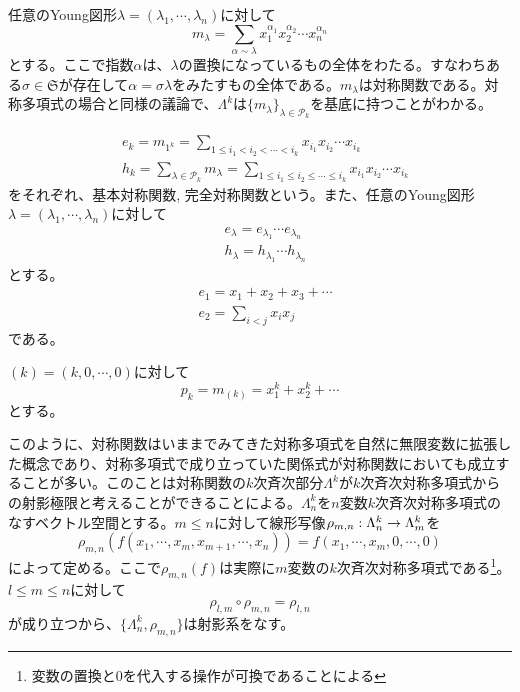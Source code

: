 \documentclass{ltjsreport}
\begin{document}
\begin{eg}[単項対称関数]\label{monomial_sym_func}
  任意のYoung図形$\lambda=(\lambda_1,\cdots,\lambda_n)$に対して
  \[
  m_{\lambda}=\sum_{\alpha\sim\lambda}x_1^{\alpha_1}x_2^{\alpha_2}\cdots x_{n}^{\alpha_n}
  \]
  とする。ここで指数$\alpha$は、$\lambda$の置換になっているもの全体をわたる。すなわちある$\sigma\in\mathfrak{S}$が存在して$\alpha=\sigma\lambda$をみたすもの全体である。$m_\lambda$は対称関数である。対称多項式の場合と同様の議論で、$\Lambda^k$は$\{m_\lambda\}_{\lambda\in\mathcal{P}_k}$を基底に持つことがわかる。
\end{eg}

\begin{eg}
  \begin{align*}
  &e_k=m_{1^k}
  =\sum_{1\leq i_1<i_2<\cdots<i_k}x_{i_1}x_{i_2}\cdots x_{i_k}\\
  &h_k=\sum_{\lambda\in\mathcal{P}_k} m_\lambda
  =\sum_{1\leq i_1\leq i_2\leq \cdots\leq i_k}x_{i_1}x_{i_2}\cdots x_{i_k}
  \end{align*}
  をそれぞれ、基本対称関数, 完全対称関数という。また、任意のYoung図形$\lambda=(\lambda_1,\cdots,\lambda_n)$に対して
  \begin{align*}
    &e_\lambda=e_{\lambda_1}\cdots e_{\lambda_n}\\
    &h_\lambda=h_{\lambda_1}\cdots h_{\lambda_n}
  \end{align*}
  とする。
  \begin{align*}
    &e_1=x_1+x_2+x_3+\cdots\\
    &e_2=\sum_{i<j}x_ix_j
  \end{align*}
  である。
\end{eg}

\begin{eg}[べき和対称関数]
  $(k)=(k,0,\cdots,0)$に対して
  \[
  p_{k}=m_{(k)}=x_1^k+x_2^k+\cdots
  \]
  とする。
\end{eg}

このように、対称関数はいままでみてきた対称多項式を自然に無限変数に拡張した概念であり、対称多項式で成り立っていた関係式が対称関数においても成立することが多い。このことは対称関数の$k$次斉次部分$\Lambda^k$が$k$次斉次対称多項式からの射影極限と考えることができることによる。$\Lambda_n^k$を$n$変数$k$次斉次対称多項式のなすベクトル空間とする。$m\leq n$に対して線形写像$\rho_{m,n}:\Lambda^k_n\rightarrow\Lambda^k_m$を
\[
\rho_{m,n}(f(x_1,\cdots,x_m,x_{m+1},\cdots,x_n))=f(x_1,\cdots,x_m,0,\cdots,0)  
\]
によって定める。ここで$\rho_{m,n}(f)$は実際に$m$変数の$k$次斉次対称多項式である\footnote{変数の置換と$0$を代入する操作が可換であることによる}。$l\leq m\leq n$に対して
\[
\rho_{l,m}\circ\rho_{m,n}=\rho_{l,n}  
\]
が成り立つから、$\{\Lambda^k_n,\rho_{m,n}\}$は射影系をなす。
\end{document}
